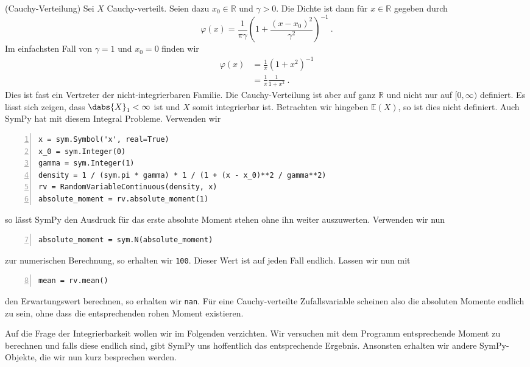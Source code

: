 \begin{Beispiel}{(Cauchy-Verteilung)}
Sei $X$ Cauchy-verteilt. Seien dazu $x_0 \in \mathbb{R}$ und $\gamma > 0$. Die Dichte ist dann für $x \in \mathbb{R}$ gegeben durch
\[\varphi(x) = \frac{1}{\pi \gamma} \left( 1 + \frac{(x - x_0)^2}{\gamma^2} \right)^{-1}~.\]
Im einfachsten Fall von $\gamma = 1$ und $x_0 = 0$ finden wir
\begin{align*}
\varphi(x) &= \frac{1}{\pi} \left( 1 + x^2 \right)^{-1}\\
&= \frac{1}{\pi} \frac{1}{1 + x^2}~.
\end{align*}
Dies ist fast ein Vertreter der \hyperlink{Bsp:Nicht-Int}{} nicht-integrierbaren Familie. Die Cauchy-Verteilung ist aber auf ganz $\mathbb{R}$ und nicht nur auf $[0, \infty)$ definiert. Es lässt sich zeigen, dass $\dabs{X}_1 < \infty$ ist und $X$ somit integrierbar ist. Betrachten wir hingeben $\mathbb{E}(X)$, so ist dies nicht definiert. Auch SymPy hat mit diesem Integral Probleme. Verwenden wir
\begin{lstlisting}[numbers=left, numberstyle=\tiny\color{codegray}]
x = sym.Symbol('x', real=True)
x_0 = sym.Integer(0)
gamma = sym.Integer(1)
density = 1 / (sym.pi * gamma) * 1 / (1 + (x - x_0)**2 / gamma**2)
rv = RandomVariableContinuous(density, x)
absolute_moment = rv.absolute_moment(1) 
\end{lstlisting}
so lässt SymPy den Ausdruck für das erste absolute Moment stehen ohne ihn weiter auszuwerten. Verwenden wir nun
\begin{lstlisting}[numbers=left, numberstyle=\tiny\color{codegray}, firstnumber=7]
absolute_moment = sym.N(absolute_moment)
\end{lstlisting}
zur numerischen Berechnung, so erhalten wir \lstinline|100|. Dieser Wert ist auf jeden Fall endlich. Lassen wir nun mit
\begin{lstlisting}[numbers=left, numberstyle=\tiny\color{codegray}, firstnumber=8]
mean = rv.mean()
\end{lstlisting}
den Erwartungswert berechnen, so erhalten wir \lstinline|nan|. Für eine Cauchy-verteilte Zufallsvariable scheinen also die absoluten Momente endlich zu sein, ohne dass die entsprechenden rohen Moment existieren.
\end{Beispiel}

Auf die Frage der Integrierbarkeit wollen wir im Folgenden verzichten. Wir versuchen mit dem Programm entsprechende Moment zu berechnen und falls diese endlich sind, gibt SymPy uns hoffentlich das entsprechende Ergebnis. Ansonsten erhalten wir andere SymPy-Objekte, die wir nun kurz besprechen werden.

